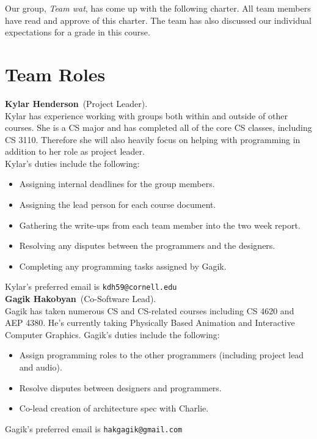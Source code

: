 \documentclass[letterpaper,11pt]{texMemo}
\newcommand{\teamname}{Team wat}
\newcommand{\teammember}[2]{ \textbf{#1}\ (#2).\ }
\newenvironment{duties}[1]
               {
                 #1's duties include the following:
                 \begin{itemize}
               }
               {
                 \end{itemize}
               }
\newcommand{\preferredemail}[2]{#1's preferred email is \texttt{#2}\\}
\begin{document}
\maketitle %


Our group, \textit{\teamname}, has come up with the following charter.
All team members have read and approve of this charter. The team has also
discussed our individual expectations for a grade in this course.

\section*{Team Roles}

\teammember{Kylar Henderson}{Project Leader}\\
Kylar has experience working 
with groups both within and outside of other courses. She is a CS major and 
has completed all of the core CS classes, including CS 3110. Therefore she 
will also heavily focus on helping with programming in addition to her role 
as project leader.\\
\begin{duties}{Kylar}
  \item Assigning internal deadlines for the group members.
  \item Assigning the lead person for each course document.
  \item Gathering the write-ups from each team member into the two week report. 
  \item Resolving any disputes between the programmers and the designers.
  \item Completing any programming tasks assigned by Gagik.
\end{duties}
\preferredemail{Kylar}{kdh59@cornell.edu}

\teammember{Gagik Hakobyan}{Co-Software Lead}\\
Gagik has taken numerous CS and CS-related courses including CS 4620 and 
AEP 4380.  He’s currently taking Physically Based Animation and Interactive 
Computer Graphics.
\begin{duties}{Gagik}
\item Assign programming roles to the other programmers 
(including project lead and audio).
\item Resolve disputes between designers and programmers.
\item Co-lead creation of architecture spec with Charlie.
\end{duties}
\preferredemail{Gagik}{hakgagik@gmail.com}
\end{document}
